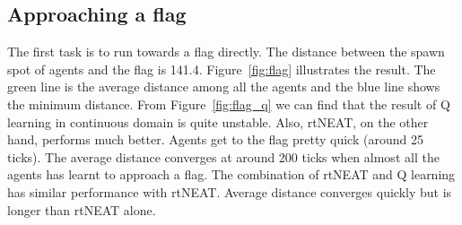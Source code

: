 \documentclass[letterpaper]{article}
\begin{document}
\subsection{Approaching a flag}
The first task is to run towards a flag directly. The distance between the spawn spot of agents and the flag is 141.4. Figure~\ref{fig:flag} illustrates the result. The green line is the average distance among all the agents and the blue line shows the minimum distance. From Figure~\ref{fig:flag_q} we can find that the result of Q learning in continuous domain is quite unstable. Also, rtNEAT, on the other hand, performs much better. Agents get to the flag pretty quick (around 25 ticks). The average distance converges at around 200 ticks when almost all the agents has learnt to approach a flag. The combination of rtNEAT and Q learning has similar performance with rtNEAT. Average distance converges quickly but is longer than rtNEAT alone. 
\end{document}
